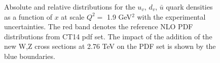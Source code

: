 \begin{figure}[!tbp]
\begin{minipage}[h]{0.4\linewidth}
\end{minipage}
\hfill
\begin{minipage}[h]{0.4\linewidth}
\end{minipage}
\vfill
\begin{minipage}[h]{0.4\linewidth}
\end{minipage}
\hfill
\begin{minipage}[h]{0.4\linewidth}
\end{minipage}
\vfill
\begin{minipage}[h]{0.4\linewidth}
\end{minipage}
\hfill
\begin{minipage}[h]{0.4\linewidth}
\end{minipage}
\caption{Absolute and  relative distributions for the $u_v$, $d_v$, $\bar{u}$ quark densities as a function of $x$ at scale $Q^2=$ 1.9 GeV$^2$ with the experimental uncertainties. The red band denotes the reference NLO PDF distributions from CT14 pdf set. The impact of the addition of the new W,Z cross sections at 2.76 TeV on the PDF set is shown by the blue boundaries.}
\label{fig:PDFValenceShift}
\end{figure}

